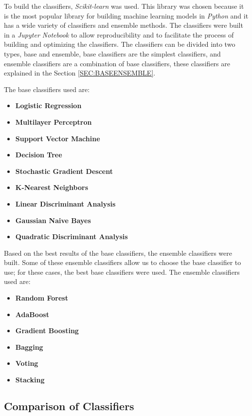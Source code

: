 To build the classifiers, \textit{Scikit-learn} was used. This library was chosen because it is the most popular library for building machine learning models in \textit{Python} and it has a wide variety of classifiers and ensemble methods. The classifiers were built in a \textit{Jupyter Notebook} to allow reproducibility and to facilitate the process of building and optimizing the classifiers. The classifiers can be divided into two types, base and ensemble, base classifiers are the simplest classifiers, and ensemble classifiers are a combination of base classifiers, these classifiers are explained in the Section \ref{SEC:BASEENSEMBLE}.

The base classifiers used are:
\begin{itemize}
    \item \textbf{Logistic Regression}
    \item \textbf{Multilayer Perceptron}
    \item \textbf{Support Vector Machine}
    \item \textbf{Decision Tree}
    \item \textbf{Stochastic Gradient Descent}
    \item \textbf{K-Nearest Neighbors}
    \item \textbf{Linear Discriminant Analysis}
    \item \textbf{Gaussian Naive Bayes}
    \item \textbf{Quadratic Discriminant Analysis}
\end{itemize}

Based on the best results of the base classifiers, the ensemble classifiers were built. Some of these ensemble classifiers allow 
us
to choose the base classifier to use; for these cases, the best base classifiers were used. The ensemble classifiers used are:
\begin{itemize}
    \item \textbf{Random Forest}
    \item \textbf{AdaBoost}
    \item \textbf{Gradient Boosting}
    \item \textbf{Bagging}
    \item \textbf{Voting}
    \item \textbf{Stacking}
\end{itemize}

\subsection{Comparison of Classifiers}

